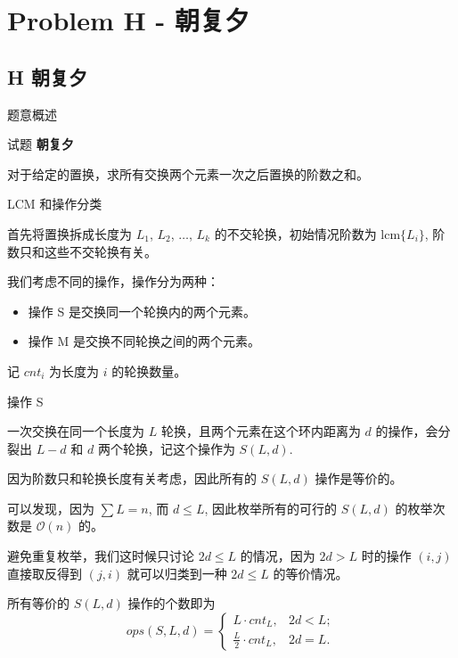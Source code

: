 \documentclass{beamer}
\newcommand{\TT}[1] {{\ttfamily #1}}
\newcommand{\BF}[1] {\textbf{#1}}
\begin{document}
{

\section[H]{Problem H - 朝复夕}
\subsection{H 朝复夕}

\begin{frame}{题意概述}

\begin{center}
试题 \myboxviii{      \BF{\TT{H}}} \BF{朝复夕}
\end{center}


对于给定的置换，求所有交换两个元素一次之后置换的阶数之和。

\end{frame}


\begin{frame}{LCM 和操作分类}

首先将置换拆成长度为 $L_1$, $L_2$, $\ldots$, $L_k$ 的不交轮换，初始情况阶数为 $\text{lcm}\{L_i\}$, 阶数只和这些不交轮换有关。

我们考虑不同的操作，操作分为两种：

\begin{itemize}
  \item 操作 S 是交换同一个轮换内的两个元素。
  \item 操作 M 是交换不同轮换之间的两个元素。
\end{itemize}

记 $cnt_i$ 为长度为 $i$ 的轮换数量。

\end{frame}

\begin{frame}{操作 S}

一次交换在同一个长度为 $L$ 轮换，且两个元素在这个环内距离为 $d$ 的操作，会分裂出 $L - d$ 和 $d$ 两个轮换，记这个操作为 $S(L, d)$.

因为阶数只和轮换长度有关考虑，因此所有的 $S(L, d)$ 操作是等价的。

可以发现，因为 $\sum L = n$, 而 $d \le L$, 因此枚举所有的可行的 $S(L, d)$ 的枚举次数是 $\mathcal{O}(n)$ 的。

避免重复枚举，我们这时候只讨论 $2d \le L$ 的情况，因为 $2d > L$ 时的操作 $(i, j)$ 直接取反得到 $(j, i)$ 就可以归类到一种 $2d \le L$ 的等价情况。

所有等价的 $S(L, d)$ 操作的个数即为
\[
  ops(S, L, d) = \begin{cases}
    L \cdot cnt_L, &2d < L;\\
    \frac{L}{2} \cdot cnt_L, & 2d = L.
  \end{cases}
\]


\end{frame}}
\end{document}
